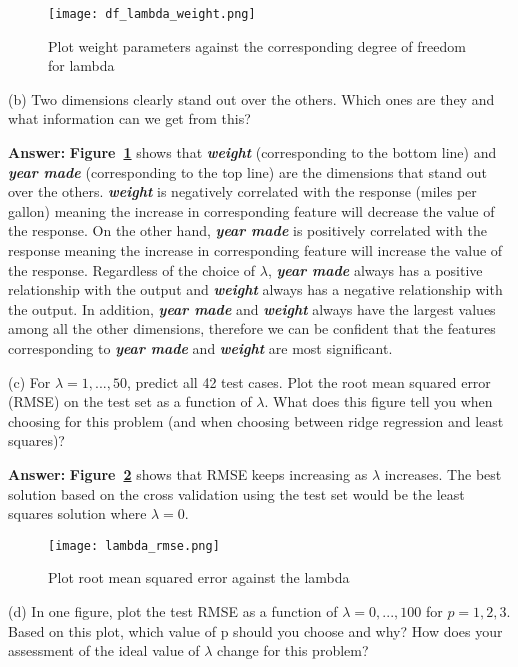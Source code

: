 \documentclass[11pt]{report}
\begin{document}
\begin{figure}[h]
\texttt{[image: df\_lambda\_weight.png]}
\centering
\caption{Plot weight parameters against the corresponding degree of freedom for lambda}
\label{fig:df_lambda_weight}
\end{figure}

\justify
(b) Two dimensions clearly stand out over the others. Which ones are they and what information can we get from this?

\justify
\textbf{Answer:} \textbf{Figure~\ref{fig:df_lambda_weight}} shows that \emph{\textbf{weight}} (corresponding to the bottom line) and \emph{\textbf{year made}} (corresponding to the top line) are the dimensions that stand out over the others. \emph{\textbf{weight}} is negatively correlated with the response (miles per gallon) meaning the increase in corresponding feature will decrease the value of the response. On the other hand, \emph{\textbf{year made}} is positively correlated with the response meaning the increase in corresponding feature will increase the value of the response. Regardless of the choice of $\lambda$,  \emph{\textbf{year made}} always has a positive relationship with the output and \emph{\textbf{weight}} always has a negative relationship with the output. In addition, \emph{\textbf{year made}} and \emph{\textbf{weight}} always have the largest values among all the other dimensions, therefore we can be confident that the features corresponding to \emph{\textbf{year made}} and \emph{\textbf{weight}} are most significant. 

\justify
(c) For $\lambda = 1, ..., 50$, predict all 42 test cases. Plot the root mean squared error (RMSE) on the test set as a function of $\lambda$. What does this figure tell you when choosing for this problem (and when choosing between ridge regression and least squares)?

\justify
\textbf{Answer:} \textbf{Figure~\ref{fig:ambda_rmse}} shows that RMSE keeps increasing as $\lambda$ increases. The best solution based on the cross validation using the test set would be the least squares solution where $\lambda = 0$. 


\begin{figure}[h]
\texttt{[image: lambda\_rmse.png]}
\centering
\caption{Plot root mean squared error against the lambda}
\label{fig:ambda_rmse}
\end{figure}


\justify
(d) In one figure, plot the test RMSE as a function of $\lambda = 0, . . . , 100$ for $ p = 1,  2, 3$. Based on this plot, which value of p should you choose and why? How does your assessment of the ideal value of $\lambda$ change for this problem?
\end{document}

